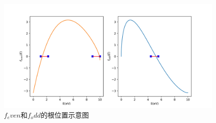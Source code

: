 \begin{figure}[ht]
  \centering
  \includegraphics[width=0.6\linewidth]{photo/f_even and f_odd.png}
  \caption{$f_even$和$f_odd$的根位置示意图}
  \label{fig:6}
\end{figure}